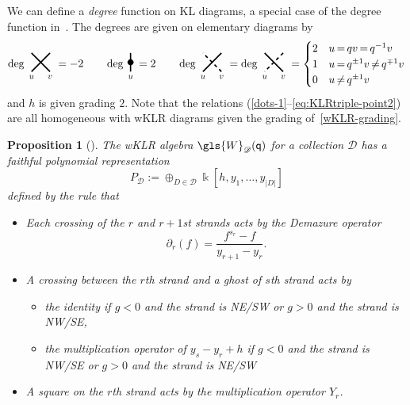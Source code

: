 \documentclass[10pt]{article}
\newtheorem{prop}[theorem]{Proposition}
\theoremstyle{definition}
\newcommand{\ck}{g}
\newcommand{\pq}{\mathsf{q}}
\newcommand{\K}{\Bbbk}%
\newcommand*{\Mk}{\mkern -2mu}
\begin{document}
We can define a \emph{degree} function on KL diagrams, a special case
of the degree function in~\cite{WebwKLR}. The degrees are
given on elementary diagrams by 
\begin{equation}
 \deg\tikz[baseline,very thick,scale=1.5]{\draw (.2,.3) -- (-.2,-.1)
 node[at end,below,
 scale=.8]{$u$}; \draw (.2,-.1) -- (-.2,.3) node[at
 start,below,scale=.8]{$v$};}
 =-2 \qquad
 \deg\tikz[baseline,very thick,scale=1.5]{\draw (0,.3) -- (0,-.1)
 node[at
 end,below,scale=.8]{$u$} node[midway,circle,fill=black,inner
 sep=2pt]{};}=2
\qquad \deg\tikz[baseline,very thick,scale=1.5]{\draw (.2,.3) -- (-.2,-.1)
 node[at
 end,below,scale=.8]{$u$}; \draw[dashed] (.2,-.1) -- (-.2,.3)
 node[at
 start,below,scale=.8]{$v$};} = 
\deg\tikz[baseline,very
 thick,scale=1.5]{\draw[dashed] (.2,.3) -- (-.2,-.1) node[at
 end,below,scale=.8]{$u$}; \draw (.2,-.1) -- (-.2,.3) node[at
 start,below,scale=.8]{$v$};}
 =
\begin{cases}
 2 & u\Mk =\Mk qv\Mk =\Mk q^{-1}v\\
 1 & u\Mk =\Mk q^{\pm 1}v\Mk \neq \Mk q^{\mp 1}v\\
 0 & u\Mk \neq\Mk  q^{\pm 1}v
 \end{cases}\label{wKLR-grading}
\end{equation}
and $h$ is given grading $2$. Note that the relations
(\ref{dots-1}--\ref{eq:KLRtriple-point2}) are all homogeneous with wKLR diagrams given the
grading of~\eqref{wKLR-grading}.
\begin{prop}[{\cite[Prop.~2.7]{WebwKLR}}]\label{W-KLR-poly}
 The wKLR algebra $\gls{W}_{\mathscr{D}}(\pq)$ for a collection
 $\mathscr{D}$ has a faithful polynomial representation
 \[P_{\mathscr{D}} := \oplus_{D\in \mathscr{D}}\K[h,y_1,\dots,
 y_{|D|}]\]
defined by the rule that 
\begin{itemize}
\item Each crossing of the $r$ and $r+1$st strands acts by the Demazure operator \[\partial_r(f)=
 \frac{f^{s_r}-f}{y_{r+1}-y_{r}}.\]
\item 
A crossing between the $r$th strand and a ghost of $s$th strand acts
by
\begin{itemize}
\item the identity if $\ck <0$ and the
 strand is NE/SW or $\ck >0$ and the strand is NW/SE,
\item the multiplication operator of $y_s-y_r+h$ if $\ck <0$ and
 the strand is NW/SE or $\ck >0$ and the strand is NE/SW
\end{itemize}
\item A square on the $r$th strand acts by the multiplication operator
 $Y_r$. 
\end{itemize}
\end{prop}
\end{document}
